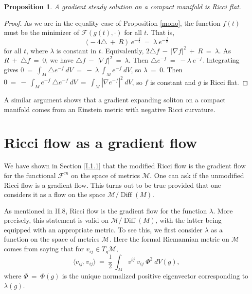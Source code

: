 \documentclass[12pt]{amsart}
\newcommand{\Diff}{\operatorname{Diff}}
\numberwithin{equation}{section}
\theoremstyle{plain}
\newtheorem{proposition}[equation]{Proposition}
\theoremstyle{definition}
\theoremstyle{remark}
\begin{document}
\begin{proposition}
A gradient steady solution on a compact manifold is Ricci flat.
\end{proposition}
\begin{proof}
As we are in the equality case of Proposition \ref{mono},
the function $f(t)$ must be the minimizer of ${\mathcal F}(g(t), \cdot)$
for all $t$. That is,
\begin{equation}
(- \: 4 \triangle \: + \: R) \: e^{-\frac{f}{2}} \: = \: \lambda \:
e^{-\frac{f}{2}}
\end{equation}
for all $t$, where $\lambda$ is constant in $t$.
Equivalently, $2 \triangle f \: - \: |\nabla f|^2 \: + \: R \: = \:
\lambda$. As $R \: + \: \triangle f \: = \: 0$, we have
$\triangle f \: - \: |\nabla f|^2 \: = \: \lambda$. Then
$\triangle e^{-f} \: = \: - \lambda \: e^{-f}$. Integrating gives
$0 \: = \: \int_M \triangle e^{-f} \: dV \: = \: - \: \lambda \:
\int_M e^{-f} \: dV$, so $\lambda \: = \: 0$. Then
$0 \: = \: - \: \int_M e^{-f} \: \triangle e^{-f} \: dV \: = \:
\int_M \left| \nabla e^{-f} \right|^2 \: dV$, 
so $f$ is constant and $g$ is Ricci flat.  
\end{proof}

A similar argument shows that a gradient expanding soliton on a
compact manifold comes from an Einstein metric with negative
Ricci curvature.

\section{Ricci flow as a gradient flow}

We have shown in Section \ref{I.1.1} that the modified Ricci flow is the gradient flow
for the functional ${\mathcal F}^m$ on the space of metrics ${\mathcal M}$.
One can ask if the unmodified Ricci flow is a gradient flow. This turns out to be true
provided that one
considers it as a flow on the space ${\mathcal M}/\Diff(M)$.

As mentioned in II.8, Ricci flow is the gradient flow
for the function $\lambda$. More precisely, this statement  is valid on ${\mathcal M}/\Diff(M)$,
with the latter being equipped with an appropriate metric.
To see this, we first
consider $\lambda$ as a function on the space of metrics ${\mathcal M}$.
Here the formal Riemannian metric on ${\mathcal M}$ comes from saying
that for $v_{ij} \in T_g {\mathcal M}$,
\begin{equation} \label{riemmetric}
\langle v_{ij}, v_{ij} \rangle \: = \: \frac12 \: 
\int_M v^{ij} \: v_{ij} \: \Phi^2 \: dV(g),
\end{equation}
where $\Phi \: = \: \Phi(g)$ is the unique
normalized positive eigenvector corresponding to $\lambda(g)$.
\end{document}
